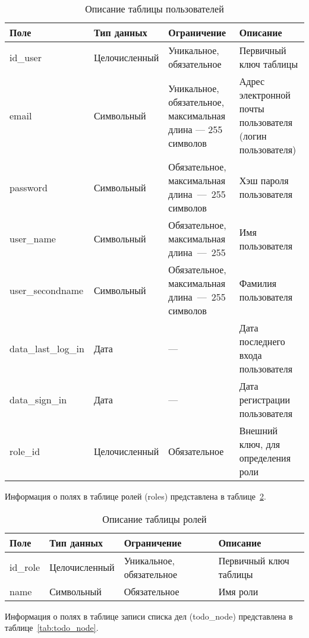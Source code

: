 \begin{table}[H]
	\centering
	\caption{Описание таблицы пользователей}
	\label{tab:user_app}
	\begin{tabularx}{\textwidth}{|l|l|X|X|}
		\hline
		\textbf{Поле} & \textbf{Тип данных} & \textbf{Ограничение} & \textbf{Описание} \\ \hline
		id\_user  & Целочисленный &  Уникальное, обязательное & Первичный ключ таблицы  \\ \hline
		email   & Символьный &  Уникальное, обязательное, максимальная длина --- 255 символов & Адрес электронной почты пользователя (логин пользователя)\\ \hline
		password  & Символьный &  Обязательное, максимальная длина~---~255 символов &  Хэш пароля пользователя \\ \hline
		user\_name  & Символьный &  Обязательное, максимальная длина~---~255 &  Имя пользователя\\ \hline
		user\_secondname  & Символьный &  Обязательное, максимальная длина~---~255 символов &  Фамилия пользователя\\ \hline
		data\_last\_log\_in & Дата & --- &  Дата последнего входа пользователя\\ \hline
		data\_sign\_in & Дата & --- & Дата регистрации пользователя\\ \hline
		role\_id & Целочисленный & Обязательное & Внешний ключ, для определения роли\\ \hline
	\end{tabularx}
\end{table}

Информация о полях в таблице ролей (roles) представлена в таблице~\ref{tab:roles}.

\begin{table}[H]
	\centering
	\caption{Описание таблицы ролей}
	\label{tab:roles}
	\begin{tabularx}{\textwidth}{|l|l|X|X|}
		\hline
		\textbf{Поле} & \textbf{Тип данных}  & \textbf{Ограничение} & \textbf{Описание} \\ \hline
		id\_role  & Целочисленный   &  Уникальное, обязательное  & Первичный ключ таблицы  \\ \hline
		name   & Символьный  &  Обязательное & Имя роли\\ \hline
	\end{tabularx}
\end{table}


Информация о полях в таблице записи списка дел (todo\_node) представлена в таблице~\ref{tab:todo_node}.

